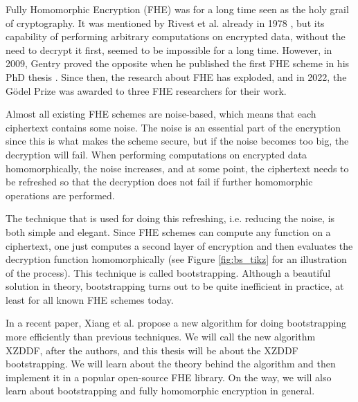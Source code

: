 Fully Homomorphic Encryption (FHE) was for a long time seen as the holy grail of cryptography. It was mentioned by Rivest et al. already in 1978 \cite{cite:first_mention_fhe}, but its capability of performing arbitrary computations on encrypted data, without the need to decrypt it first, seemed to be impossible for a long time. However, in 2009, Gentry proved the opposite when he published the first FHE scheme in his PhD thesis \cite{cite:gentry1}. Since then, the research about FHE has exploded, and in 2022, the Gödel Prize was awarded to three FHE  researchers for their work.

Almost all existing FHE schemes are noise-based, which means that each ciphertext contains some noise. The noise is an essential part of the encryption since this is what makes the scheme secure, but if the noise becomes too big, the decryption will fail. When performing computations on encrypted data homomorphically, the noise increases, and at some point, the ciphertext needs to be refreshed so that the decryption does not fail if further homomorphic operations are performed.

The technique that is used for doing this refreshing, i.e. reducing the noise, is both simple and elegant. Since FHE schemes can compute any function on a ciphertext, one just computes a second layer of encryption and then evaluates the decryption function homomorphically (see Figure \ref{fig:bs_tikz} for an illustration of the process). This technique is called bootstrapping. Although a beautiful solution in theory, bootstrapping turns out to be quite inefficient in practice, at least for all known FHE schemes today.


In a recent paper, Xiang et al. \cite{cite:fast_bootstrap_crypto23} propose a new algorithm for doing bootstrapping more efficiently than previous techniques. We will call the new algorithm XZDDF, after the authors, and this thesis will be about the XZDDF bootstrapping. We will learn about the theory behind the algorithm and then implement it in a popular open-source FHE library. On the way, we will also learn about bootstrapping and fully homomorphic encryption in general.

